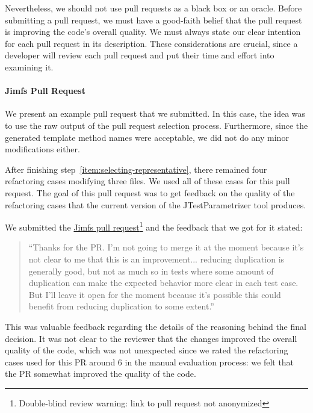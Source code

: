 
Nevertheless, we should not use pull requests as a black box or an oracle. Before submitting a pull request, we must have a good-faith belief that the pull request is improving the code's overall quality. We must always state our clear intention for each pull request in its description. These considerations are crucial, since a developer will review each pull request and put their time and effort into examining it. 

\paragraph{Jimfs Pull Request}
We present an example pull request that we submitted. In this case, the idea was to use the raw output of the pull request selection process. Furthermore, since the generated template method names were acceptable, we did not do any minor modifications either.

After finishing step~\ref{item:selecting-representative}, there remained four refactoring cases modifying three files. We used all of these cases for this pull request. The goal of this pull request was to get feedback on the quality of the refactoring cases that the current version of the JTestParametrizer tool produces.

We submitted the \href{https://github.com/google/jimfs/pull/159}{Jimfs pull request}\footnote{Double-blind review warning: link to pull request not anonymized} and the feedback that we got for it stated: \begin{quote}``Thanks for the PR. I'm not going to merge it at the moment because it's not clear to me that this is an improvement... reducing duplication is generally good, but not as much so in tests where some amount of duplication can make the expected behavior more clear in each test case. But I'll leave it open for the moment because it's possible this could benefit from reducing duplication to some extent.''\end{quote}

This was valuable feedback regarding the details of the reasoning behind the final decision. It was not clear to the reviewer that the changes improved the overall quality of the code, which was not unexpected since we rated the refactoring cases used for this PR around 6 in the manual evaluation process: we felt that the PR somewhat improved the quality of the code. 


